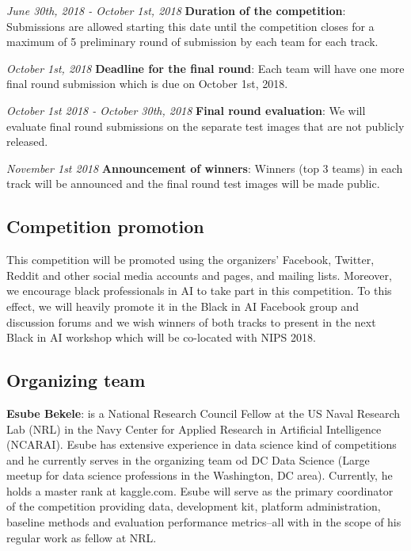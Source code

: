 \documentclass[11pt, oneside]{article}
\begin{document}
{\it June 30th, 2018 - October 1st, 2018} {\bf Duration of the competition}: Submissions are allowed starting this date until the competition closes for a maximum of 5 preliminary round of submission by each team for each track.

{\it October 1st, 2018} {\bf Deadline for the final round}: Each team will have one more final round submission which is due on October 1st, 2018.

{\it October 1st 2018 - October 30th, 2018} {\bf Final round evaluation}: We will evaluate final round submissions on the separate test images that are not publicly released.

{\it November 1st 2018} {\bf Announcement of winners}: Winners (top 3 teams) in each track will be announced and the final round test images will be made public.

\subsection{Competition promotion}

This competition will be promoted using the organizers' Facebook, Twitter, Reddit and other social media accounts and pages, and mailing lists. Moreover, we encourage black professionals in AI to take part in this competition. To this effect, we will heavily promote it in the Black in AI Facebook group and discussion forums and we wish winners of both tracks to present in the next Black in AI workshop which will be co-located with NIPS 2018.

\subsection{Organizing team}

{\bf Esube Bekele}: is a National Research Council Fellow at the US Naval Research Lab (NRL) in the Navy Center for Applied Research in Artificial Intelligence (NCARAI). Esube has extensive experience in data science kind of competitions and he currently serves in the organizing team od DC Data Science (Large meetup for data science professions in the Washington, DC area). Currently, he holds a master rank at kaggle.com. Esube will serve as the primary coordinator of the competition providing data, development kit, platform administration, baseline methods and evaluation performance metrics--all with in the scope of his regular work as fellow at NRL.
\end{document}
